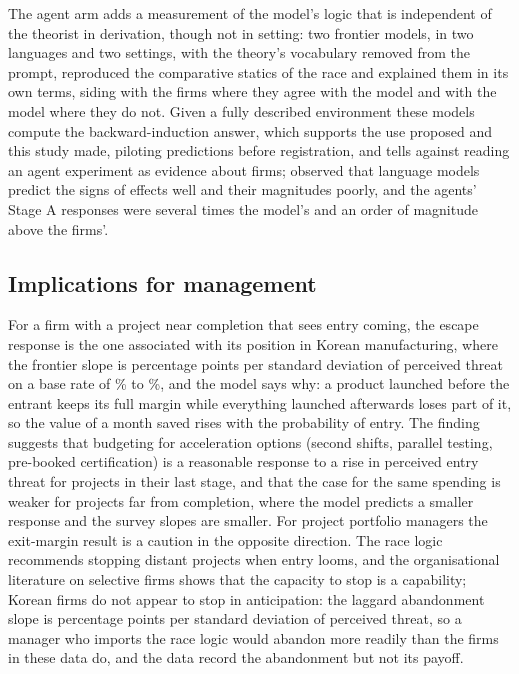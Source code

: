 \documentclass[preprint,12pt,authoryear]{elsarticle}
\begin{document}
The agent arm adds a measurement of the model's logic that is independent of the theorist in derivation, though not in setting: two frontier models, in two languages and two settings, with the theory's vocabulary removed from the prompt, reproduced the comparative statics of the race and explained them in its own terms, siding with the firms where they agree with the model and with the model where they do not. Given a fully described environment these models compute the backward-induction answer, which supports the use \citet{horton2023large} proposed and this study made, piloting predictions before registration, and tells against reading an agent experiment as evidence about firms; \citet{manning2024automated} observed that language models predict the signs of effects well and their magnitudes poorly, and the agents' Stage A responses were several times the model's and an order of magnitude above the firms'.

\subsection{Implications for management}

For a firm with a project near completion that sees entry coming, the escape response is the one associated with its position in Korean manufacturing, where the frontier slope is \RobManuHOnePp{} percentage points per standard deviation of perceived threat on a base rate of \PreemptRateTwoZeroTwoTwoMPct\% to \PreemptRateTwoZeroTwoFourMPct\%, and the model says why: a product launched before the entrant keeps its full margin while everything launched afterwards loses part of it, so the value of a month saved rises with the probability of entry. The finding suggests that budgeting for acceleration options (second shifts, parallel testing, pre-booked certification) is a reasonable response to a rise in perceived entry threat for projects in their last stage, and that the case for the same spending is weaker for projects far from completion, where the model predicts a smaller response and the survey slopes are smaller. For project portfolio managers the exit-margin result is a caution in the opposite direction. The race logic recommends stopping distant projects when entry looms, and the organisational literature on selective firms \citep{klingebiel2021optionality} shows that the capacity to stop is a capability; Korean firms do not appear to stop in anticipation: the laggard abandonment slope is \KISHTwoPp{} percentage points per standard deviation of perceived threat, so a manager who imports the race logic would abandon more readily than the firms in these data do, and the data record the abandonment but not its payoff.
\end{document}
